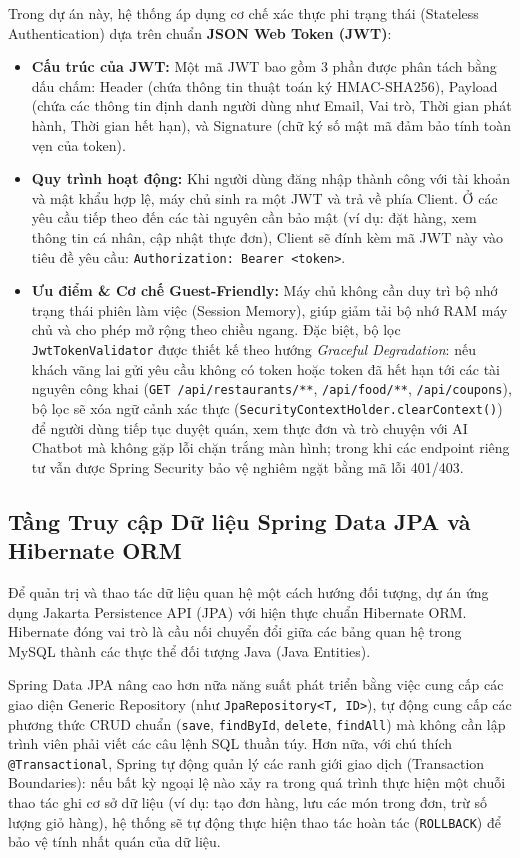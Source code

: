 \documentclass{uetgraduation}
\begin{document}
Trong dự án này, hệ thống áp dụng cơ chế xác thực phi trạng thái (Stateless Authentication) dựa trên chuẩn \textbf{JSON Web Token (JWT)}:
\begin{itemize}
    \item \textbf{Cấu trúc của JWT:} Một mã JWT bao gồm 3 phần được phân tách bằng dấu chấm: Header (chứa thông tin thuật toán ký HMAC-SHA256), Payload (chứa các thông tin định danh người dùng như Email, Vai trò, Thời gian phát hành, Thời gian hết hạn), và Signature (chữ ký số mật mã đảm bảo tính toàn vẹn của token).
    \item \textbf{Quy trình hoạt động:} Khi người dùng đăng nhập thành công với tài khoản và mật khẩu hợp lệ, máy chủ sinh ra một JWT và trả về phía Client. Ở các yêu cầu tiếp theo đến các tài nguyên cần bảo mật (ví dụ: đặt hàng, xem thông tin cá nhân, cập nhật thực đơn), Client sẽ đính kèm mã JWT này vào tiêu đề yêu cầu: \texttt{Authorization: Bearer <token>}.
    \item \textbf{Ưu điểm \& Cơ chế Guest-Friendly:} Máy chủ không cần duy trì bộ nhớ trạng thái phiên làm việc (Session Memory), giúp giảm tải bộ nhớ RAM máy chủ và cho phép mở rộng theo chiều ngang. Đặc biệt, bộ lọc \texttt{JwtTokenValidator} được thiết kế theo hướng \textit{Graceful Degradation}: nếu khách vãng lai gửi yêu cầu không có token hoặc token đã hết hạn tới các tài nguyên công khai (\texttt{GET /api/restaurants/**}, \texttt{/api/food/**}, \texttt{/api/coupons}), bộ lọc sẽ xóa ngữ cảnh xác thực (\texttt{SecurityContextHolder.clearContext()}) để người dùng tiếp tục duyệt quán, xem thực đơn và trò chuyện với AI Chatbot mà không gặp lỗi chặn trắng màn hình; trong khi các endpoint riêng tư vẫn được Spring Security bảo vệ nghiêm ngặt bằng mã lỗi 401/403.
\end{itemize}

\subsection{Tầng Truy cập Dữ liệu Spring Data JPA và Hibernate ORM}
Để quản trị và thao tác dữ liệu quan hệ một cách hướng đối tượng, dự án ứng dụng Jakarta Persistence API (JPA) với hiện thực chuẩn Hibernate ORM. Hibernate đóng vai trò là cầu nối chuyển đổi giữa các bảng quan hệ trong MySQL thành các thực thể đối tượng Java (Java Entities).

Spring Data JPA nâng cao hơn nữa năng suất phát triển bằng việc cung cấp các giao diện Generic Repository (như \texttt{JpaRepository<T, ID>}), tự động cung cấp các phương thức CRUD chuẩn (\texttt{save}, \texttt{findById}, \texttt{delete}, \texttt{findAll}) mà không cần lập trình viên phải viết các câu lệnh SQL thuần túy. Hơn nữa, với chú thích \texttt{@Transactional}, Spring tự động quản lý các ranh giới giao dịch (Transaction Boundaries): nếu bất kỳ ngoại lệ nào xảy ra trong quá trình thực hiện một chuỗi thao tác ghi cơ sở dữ liệu (ví dụ: tạo đơn hàng, lưu các món trong đơn, trừ số lượng giỏ hàng), hệ thống sẽ tự động thực hiện thao tác hoàn tác (\texttt{ROLLBACK}) để bảo vệ tính nhất quán của dữ liệu.
\end{document}
